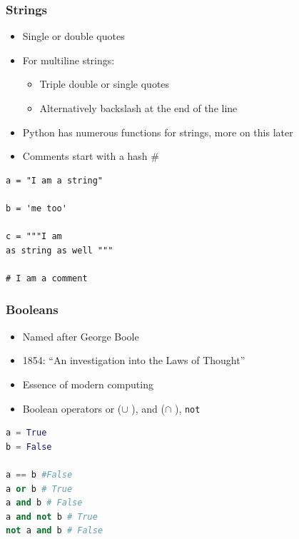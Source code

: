\documentclass[english]{beamer}
\begin{document}
\begin{frame}[containsverbatim]
\frametitle{Strings}

\begin{itemize}
\item Single or double quotes
\item For multiline strings:

\begin{itemize}
	\item Triple double or single quotes
	\item Alternatively backslash at the end of the line 
\end{itemize}

\item Python has numerous functions for strings, more on this later
\item Comments start with a hash \#
\end{itemize}


\begin{lstlisting}[style=Python]
a = "I am a string"

b = 'me too'

c = """I am 
as string as well """

# I am a comment
\end{lstlisting}


\end{frame}

\begin{frame}[containsverbatim]
\frametitle{Booleans}

\begin{itemize}
	\item Named after George Boole
	\item 1854: \enquote{An investigation into the Laws of Thought}
	\item Essence of modern computing
	\item Boolean operators or ($\cup$ ),  and ($\cap$ ), \texttt{not}
\end{itemize}

\begin{lstlisting}[language={Python}]
a = True
b = False 

a == b #False
a or b # True
a and b # False
a and not b # True
not a and b # False
\end{lstlisting}
\end{frame}
\end{document}
